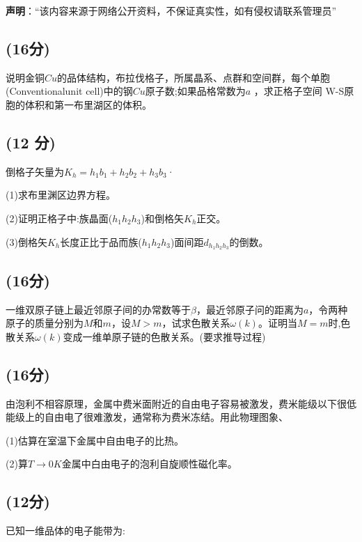 
\textbf{声明}：“该内容来源于网络公开资料，不保证真实性，如有侵权请联系管理员”

\subsection{(16分)}
说明金铜$Cu$的品体结构，布拉伐格子，所属晶系、点群和空间群，每个单胞(Conventionalunit cell)中的钢$Cu$原子数;如果品格常数为$a$ ，求正格子空间 W-S原胞的体积和第一布里湖区的体积。
\subsection{(12 分)}
倒格子矢量为$K_h=h_1b_1+h_2b_2+h_3b_3$·

(1)求布里渊区边界方程。

(2)证明正格子中:族晶面($h_1h_2h_3$)和倒格矢$K_h$正交。

(3)倒格矢$K_h$长度正比于品而族($h_1h_2h_3$)面间距$d_{h_1h_2h_3}$的倒数。
\subsection{(16分)}
一维双原子链上最近邻原子间的办常数等于$\beta$，最近邻原子问的距离为$a$，令两种原子的质量分别为$M$和$m$，设$M>m$，试求色散关系$\omega(k)$。证明当$M=m$时,色散关系$\omega(k)$变成一维单原子链的色散关系。(要求推导过程)
\subsection{(16分)}
由泡利不相容原理，金属中费米面附近的自由电子容易被激发，费米能级以下很低能级上的自由电了很难激发，通常称为费米冻结。用此物理图象、

(1)估算在室温下金属中自由电子的比热。

(2)算$T\to0K$金属中白由电子的泡利自旋顺性磁化率。
\subsection{(12分)}
已知一维品体的电子能带为: